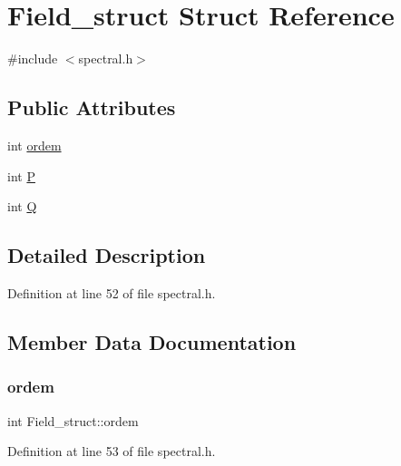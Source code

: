 \hypertarget{structField__struct}{}\section{Field\+\_\+struct Struct Reference}
\label{structField__struct}


{\ttfamily \#include $<$spectral.\+h$>$}

\subsection*{Public Attributes}
\begin{DoxyCompactItemize}
\item 
int \hyperlink{structField__struct_a33c420bca8dda8e3507966bc8ad2a7be}{ordem}
\item 
int \hyperlink{structField__struct_a21a4ad244c000f61f40531b732b16f1e}{P}
\item 
int \hyperlink{structField__struct_a33955556d3e366de8c3d81b305c237f3}{Q}
\end{DoxyCompactItemize}


\subsection{Detailed Description}


Definition at line 52 of file spectral.\+h.



\subsection{Member Data Documentation}
\mbox{\label{structField__struct_a33c420bca8dda8e3507966bc8ad2a7be}} 
\subsubsection{\texorpdfstring{ordem}{ordem}}
{\footnotesize\ttfamily int Field\+\_\+struct\+::ordem}



Definition at line 53 of file spectral.\+h.

\mbox{\label{structField__struct_a21a4ad244c000f61f40531b732b16f1e}} 
